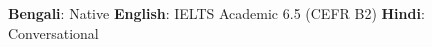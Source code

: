%
%
%



\vspace{0.5em}

\hspace{1em}\textbf{Bengali}: Native \quad
\textbf{English}: IELTS Academic 6.5 (CEFR B2) \quad
\textbf{Hindi}: Conversational
